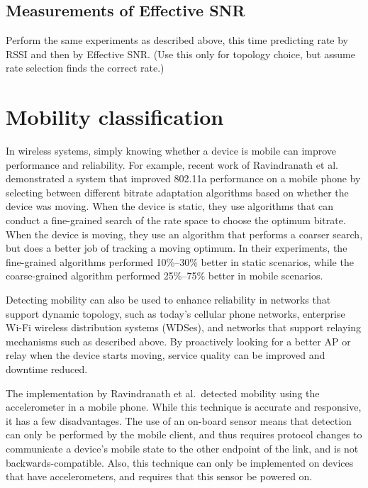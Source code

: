 \subsection{Measurements of Effective SNR}
Perform the same experiments as described above, this time predicting rate by RSSI and then by Effective SNR\@. (Use this only for topology choice, but assume rate selection finds the correct rate.)

\section{Mobility classification}\label{sec:esnr_mobility}
In wireless systems, simply knowing whether a device is mobile can improve performance and reliability. For example, recent work of Ravindranath et al.\ \cite{Ravindranath_SensorHints} demonstrated a system that improved 802.11a performance on a mobile phone by selecting between different bitrate adaptation algorithms based on whether the device was moving. When the device is static, they use algorithms that can conduct a fine-grained search of the rate space to choose the optimum bitrate. When the device is moving, they use an algorithm that performs a coarser search, but does a better job of tracking a moving optimum. In their experiments, the fine-grained algorithms performed 10\%--30\% better in static scenarios, while the coarse-grained algorithm performed 25\%--75\% better in mobile scenarios.

Detecting mobility can also be used to enhance reliability in networks that support dynamic topology, such as today's cellular phone networks, enterprise Wi-Fi wireless distribution systems (WDSes), and networks that support relaying mechanisms such as described above. By proactively looking for a better AP or relay when the device starts moving, service quality can be improved and downtime reduced. 

The implementation by Ravindranath et al.\ detected mobility using the accelerometer in a mobile phone. While this technique is accurate and responsive, it has a few disadvantages. The use of an on-board sensor means that detection can only be performed by the mobile client, and thus requires protocol changes to communicate a device's mobile state to the other endpoint of the link, and is not backwards-compatible. Also, this technique can only be implemented on devices that have accelerometers, and requires that this sensor be powered on.

